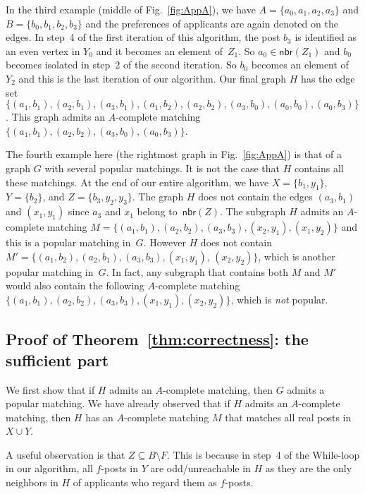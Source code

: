\documentclass[11pt]{llncs}
\newcommand{\Nbr}{\mathsf{nbr}}
\begin{document}
\smallskip

In the third example (middle of Fig.~\ref{fig:AppA}), we have $A = \{a_0,a_1,a_2,a_3\}$ and $B = \{b_0,b_1,b_2,b_3\}$ 
and the preferences of applicants are again denoted on the edges. In step~4 of the first iteration of this algorithm, the post $b_3$
is identified as an even vertex in $Y_0$ and it becomes an element of~$Z_1$. So $a_0 \in \Nbr(Z_1)$ and $b_0$ becomes isolated in step~2 
of the second iteration. So $b_0$ becomes an element of $Y_2$  and this is the last iteration of our algorithm. 
Our final graph $H$ has the edge set $\{(a_1,b_1),(a_2,b_1),(a_3,b_1),(a_1,b_2),(a_2,b_2),(a_3,b_0),(a_0,b_0),(a_0,b_3)\}$. 
This graph admits an $A$-complete matching $\{(a_1,b_1),(a_2,b_2),(a_3,b_0),(a_0,b_3)\}$.

\smallskip

The fourth example here (the rightmost graph in Fig.~\ref{fig:AppA}) is that of a  graph $G$ with several popular matchings. 
It is not the case that $H$ contains all these matchings.  At the end of our entire algorithm, we have $X = \{b_1,y_1\}$, $Y = \{b_2\}$,
and $Z = \{b_3,y_2,y_3\}$. The graph $H$ does not contain the edges $(a_3,b_1)$ and $(x_1,y_1)$ since $a_3$ and $x_1$ belong to~$\Nbr(Z)$. 
The subgraph $H$ admits an $A$-complete matching $M = \{(a_1,b_1),(a_2,b_2),(a_3,b_3),(x_2,y_1),(x_1,y_2)\}$ and this is a popular matching in~$G$.
However $H$ does not contain $M' = \{(a_1,b_2),(a_2,b_1),(a_3,b_3),(x_1,y_1)$, $(x_2,y_2)\}$, which is another popular matching in~$G$.
In fact, any subgraph that contains both $M$ and $M'$ would also contain the following $A$-complete matching
$\{(a_1,b_1),(a_2,b_2),(a_3,b_3),(x_1,y_1),(x_2,y_2)\}$, which is {\em not} popular.



\subsection{Proof of Theorem~\ref{thm:correctness}: the sufficient part} 
\label{sec:suff}

We first show that if $H$ admits an $A$-complete matching, then 
$G$ admits a popular matching. We have already observed that if $H$ admits an $A$-complete matching, then $H$ has an $A$-complete matching $M$ that matches all real posts in~$X \cup Y$.

A useful observation is that $Z \subseteq B \setminus F$. This is because in step~4 of the 
While-loop in our algorithm, all $f$-posts in $Y$ are odd/unreachable in $H$ as they are the 
only neighbors in $H$ of applicants who regard them as $f$-posts.
\end{document}
